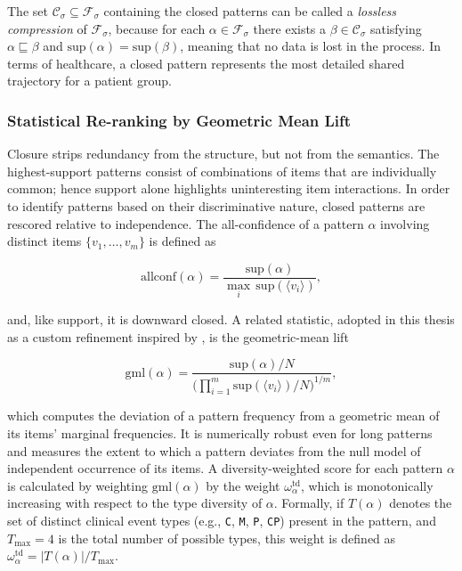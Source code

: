 The set $\mathcal{C}_\sigma \subseteq \mathcal{F}_\sigma$ containing the closed patterns can be called a \emph{lossless compression} of $\mathcal{F}_\sigma$, because for each $\alpha \in \mathcal{F}_\sigma$ there exists a $\beta \in \mathcal{C}_\sigma$ satisfying $\alpha \sqsubseteq \beta$ and $\mathrm{sup}(\alpha) = \mathrm{sup}(\beta)$, meaning that no data is lost in the process. In terms of healthcare, a closed pattern represents the most detailed shared trajectory for a patient group.

\subsubsection*{Statistical Re-ranking by Geometric Mean Lift}

Closure strips redundancy from the structure, but not from the semantics. The highest-support patterns consist of combinations of items that are individually common; hence support alone highlights uninteresting item interactions. In order to identify patterns based on their discriminative nature, closed patterns are rescored relative to independence. The all-confidence of a pattern $\alpha$ involving distinct items $\{v_1, \ldots, v_m\}$ \cite{omiecinski2003} is defined as

\begin{equation}
    \mathrm{allconf}(\alpha) = \frac{\mathrm{sup}(\alpha)}{\max_{i}\, \mathrm{sup}(\langle v_i \rangle)},
    \label{eq:allconf}
\end{equation}

and, like support, it is downward closed. A related statistic, adopted in this thesis as a custom refinement inspired by \cite{omiecinski2003}, is the geometric-mean lift

\begin{equation}
    \mathrm{gml}(\alpha) = \frac{\mathrm{sup}(\alpha)/N}{\bigl(\prod_{i=1}^{m} \mathrm{sup}(\langle v_i \rangle)/N\bigr)^{1/m}},
    \label{eq:gml}
\end{equation}

which computes the deviation of a pattern frequency from a geometric mean of its items' marginal frequencies. It is numerically robust even for long patterns and measures the extent to which a pattern deviates from the null model of independent occurrence of its items. A diversity-weighted score for each pattern $\alpha$ is calculated by weighting $\mathrm{gml}(\alpha)$ by the weight $\omega_\alpha^{\mathrm{td}}$, which is monotonically increasing with respect to the type diversity of $\alpha$. Formally, if $T(\alpha)$ denotes the set of distinct clinical event types (e.g., \texttt{C}, \texttt{M}, \texttt{P}, \texttt{CP}) present in the pattern, and $T_{\max} = 4$ is the total number of possible types, this weight is defined as $\omega_\alpha^{\mathrm{td}} = |T(\alpha)| / T_{\max}$.

